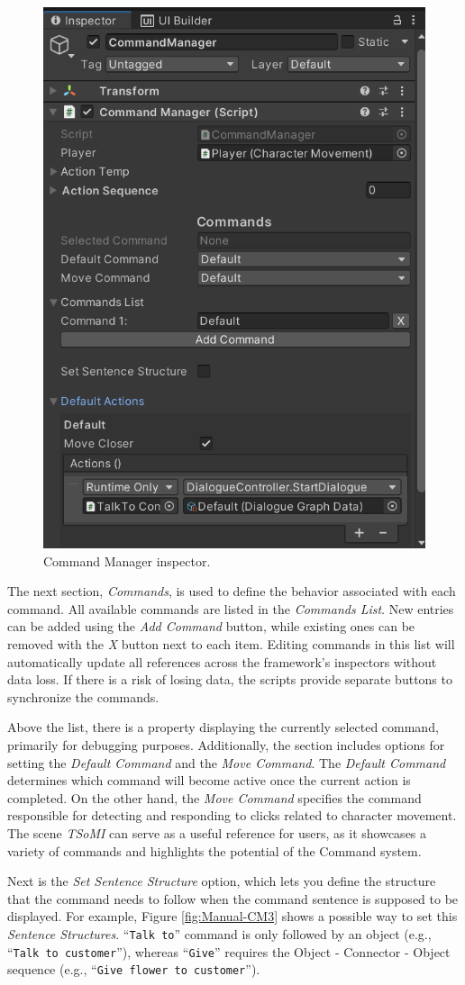 \begin{figure}[H]
\centering
\includegraphics[width=.6\linewidth]{img/User doc/command_manager.png}
\caption{Command Manager inspector.}
\label{fig:Manual-CM}
\end{figure}

The next section, \textit{Commands}, is used to define the behavior associated with each command. All available commands are listed in the \textit{Commands List}. New entries can be added using the \textit{Add Command} button, while existing ones can be removed with the \textit{X} button next to each item. Editing commands in this list will automatically update all references across the framework’s inspectors without data loss. If there is a risk of losing data, the scripts provide separate buttons to synchronize the commands.

Above the list, there is a property displaying the currently selected command, primarily for debugging purposes. Additionally, the section includes options for setting the \textit{Default Command} and the \textit{Move Command}. The \textit{Default Command} determines which command will become active once the current action is completed. On the other hand, the \textit{Move Command} specifies the command responsible for detecting and responding to clicks related to character movement. The scene \textit{TSoMI} can serve as a useful reference for users, as it showcases a variety of commands and highlights the potential of the Command system.

Next is the \textit{Set Sentence Structure} option, which lets you define the structure that the command needs to follow when the command sentence is supposed to be displayed. For example, Figure \ref{fig:Manual-CM3} shows a possible way to set this \textit{Sentence Structures}. “\verb|Talk to|” command is only followed by an object (e.g., “\verb|Talk to customer|”), whereas “\verb|Give|” requires the Object - Connector - Object sequence (e.g., “\verb|Give flower to customer|”).

